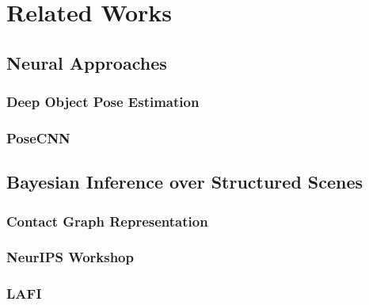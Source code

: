 
\section{Related Works}


\subsection{Neural Approaches}

\todo

\subsubsection{Deep Object Pose Estimation}

\todo
\cite{DBLP:journals/corr/abs-1809-10790}

\subsubsection{PoseCNN}

\todo


\subsection{Bayesian Inference over Structured Scenes}

\todo

\subsubsection{Contact Graph Representation}


\subsubsection{NeurIPS Workshop}


\subsubsection{LAFI}

